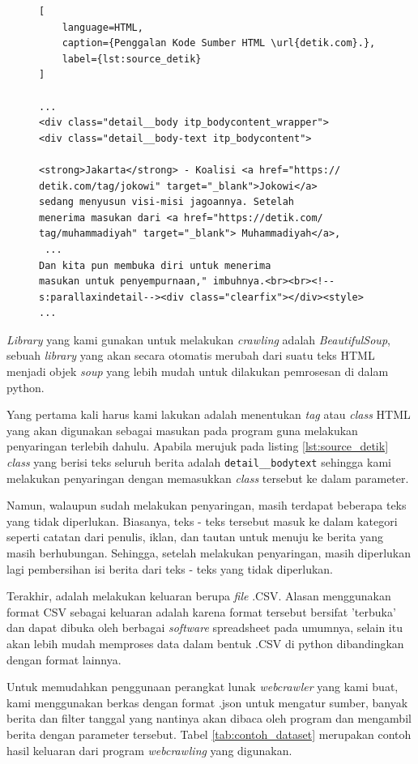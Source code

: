 \begin{figure}[h!]
  \begin{lstlisting}[
    language=HTML, 
    caption={Penggalan Kode Sumber HTML \url{detik.com}.},
    label={lst:source_detik}
]

...
<div class="detail__body itp_bodycontent_wrapper">
<div class="detail__body-text itp_bodycontent">

<strong>Jakarta</strong> - Koalisi <a href="https://
detik.com/tag/jokowi" target="_blank">Jokowi</a> 
sedang menyusun visi-misi jagoannya. Setelah 
menerima masukan dari <a href="https://detik.com/
tag/muhammadiyah" target="_blank"> Muhammadiyah</a>,
 ... 
Dan kita pun membuka diri untuk menerima 
masukan untuk penyempurnaan," imbuhnya.<br><br><!--
s:parallaxindetail--><div class="clearfix"></div><style>
...

\end{lstlisting}
\end{figure}

\textit{Library} yang kami gunakan untuk melakukan \textit{crawling} adalah \textit{BeautifulSoup}, sebuah \textit{library} yang akan secara otomatis merubah dari suatu teks HTML menjadi objek \textit{soup} yang lebih mudah untuk dilakukan pemrosesan di dalam python.

Yang pertama kali harus kami lakukan adalah menentukan \textit{tag} atau \textit{class} HTML yang akan digunakan sebagai masukan pada program guna melakukan penyaringan terlebih dahulu. Apabila merujuk pada listing \ref{lst:source_detik} \textit{class} yang berisi teks seluruh berita adalah \texttt{detail\_\_body\-text} sehingga kami melakukan penyaringan dengan memasukkan \textit{class} tersebut ke dalam parameter.

Namun, walaupun sudah melakukan penyaringan, masih terdapat beberapa teks yang tidak diperlukan. Biasanya, teks - teks tersebut masuk ke dalam  kategori seperti catatan dari penulis, iklan, dan tautan untuk menuju ke berita yang masih berhubungan. Sehingga, setelah melakukan penyaringan, masih diperlukan lagi pembersihan isi berita dari teks - teks yang tidak diperlukan.

Terakhir, adalah melakukan keluaran berupa \textit{file} .CSV. Alasan menggunakan format CSV sebagai keluaran adalah karena format tersebut bersifat 'terbuka' dan dapat dibuka oleh berbagai \textit{software} spreadsheet pada umumnya, selain itu akan lebih mudah memproses data dalam bentuk .CSV di python dibandingkan dengan format lainnya.

Untuk memudahkan penggunaan perangkat lunak \textit{webcrawler} yang kami buat, kami menggunakan berkas dengan format .json untuk mengatur sumber, banyak berita dan filter tanggal yang nantinya akan dibaca oleh program dan mengambil berita dengan parameter tersebut. Tabel \ref{tab:contoh_dataset} merupakan contoh hasil keluaran dari program \textit{webcrawling} yang digunakan.

